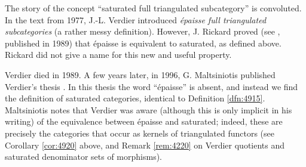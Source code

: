\begin{rem} \label{rem:4777}
The story of the concept ``saturated full triangulated 
subcategory'' is convoluted. In the text \cite{Ver0} from 1977, J.-L. Verdier 
introduced {\em \'epaisse full triangulated subcategories}
(a rather messy definition). However, J. Rickard proved (see  
\cite[Proposition 1.3]{Ric0}, published in 1989) that \'epaisse is equivalent 
to saturated, as defined above. Rickard did not give a name for this new 
and useful property. 

Verdier died in 1989. A few years later, in 1996, G. Maltsiniotis published 
Verdier's thesis \cite{Ver}. In this thesis the word ``\'epaisse'' is absent, 
and instead we find the definition of saturated categories, identical to 
Definition \ref{dfn:4915}. Maltsiniotis notes that Verdier was aware (although 
this is only implicit in his writing) of the equivalence between \'epaisse and 
saturated; indeed, these are precisely the categories that occur as kernels of 
triangulated functors (see Corollary \ref{cor:4920} above, and Remark 
\ref{rem:4220} on Verdier quotients and saturated denominator 
sets of morphisms). 
\end{rem}

